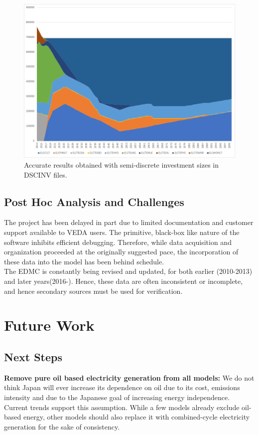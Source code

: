 \documentclass[14pt,a4paper]{article} %
\begin{document}
\begin{figure}[H]
\centering
\includegraphics[scale=0.45]{flat-good}
\caption{Accurate results obtained with semi-discrete investment sizes in \gls{DSCINV} files.}
\label{flatgood}
\end{figure}

\subsection{Post Hoc Analysis and Challenges} 

The project has been delayed in part due to limited documentation and customer support available to VEDA users. The primitive, black-box like nature of the software inhibits efficient debugging. Therefore, while data acquisition and organization proceeded at the originally suggested pace, the incorporation of these data into the model has been behind schedule. \\

The \gls{EDMC} is constantly being revised and updated, for both earlier (2010-2013) and later years(2016-). Hence, these data are often inconsistent or incomplete, and hence secondary sources must be used for verification.
\section{Future Work} 

\subsection{Next Steps}

\textbf{Remove pure oil based electricity generation from all models:} We do not think Japan will ever increase its dependence on oil due to its cost, emissions intensity and due to the Japanese goal of increasing energy independence. Current trends support this assumption. While a few models already exclude oil-based energy, other models should also replace it with combined-cycle electricity generation for the sake of consistency.\\
\end{document}
